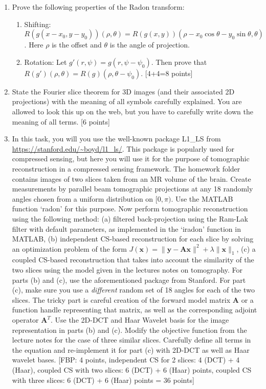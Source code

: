 \documentclass[11pt]{article}
\begin{document}
\begin{enumerate}
\item Prove the following properties of the Radon transform:
\begin{enumerate}
\item Shifting: $R(g(x-x_0,y-y_0))(\rho,\theta) = R(g(x,y))(\rho-x_0 \cos \theta - y_0 \sin \theta,\theta)$. Here $\rho$ is the offset and $\theta$ is the angle of projection.
\item Rotation: Let $g'(r,\psi) = g(r,\psi-\psi_0)$. Then prove that $R(g')(\rho,\theta) = R(g)(\rho,\theta-\psi_0)$.
\textsf{[4+4=8 points]}
\end{enumerate}

\item State the Fourier slice theorem for 3D images (and their associated 2D projections) with the meaning of all symbols carefully explained. You are allowed to look this up on the web, but you have to carefully write down the meaning of all terms. \textsf{[6 points]}

\item In this task, you will you use the well-known package L1\_LS from \url{https://stanford.edu/~boyd/l1_ls/}. This package is popularly used for compressed sensing, but here you will use it for the purpose of tomographic reconstruction in a compressed sensing framework. The homework folder contains images of two slices taken from an MR volume of the brain. Create measurements by parallel beam tomographic projections at any 18 randomly angles chosen from a uniform distribution on $[0,\pi)$. Use the MATLAB function `radon' for this purpose. Now perform tomographic reconstruction using the following method: (a) filtered back-projection using the Ram-Lak filter with default parameters, as implemented in the `iradon' function in MATLAB, (b) independent CS-based reconstruction for each slice by solving an optimization problem of the form $J(\boldsymbol{x}) = \|\boldsymbol{y}-\boldsymbol{Ax}\|^2 + \lambda \|\boldsymbol{x}\|_1$, (c) a coupled CS-based reconstruction that takes into account the similarity of the two slices using the model given in the lectures notes on tomography. For parts (b) and (c), use the aforementioned package from Stanford. For part (c), make sure you use a \emph{different} random set of 18 angles for each of the two slices. The tricky part is careful creation of the forward model matrix $\boldsymbol{A}$ or a function handle representing that matrix, as well as the corresponding adjoint operator $\boldsymbol{A}^T$. Use the 2D-DCT and Haar Wavelet basis for the image representation in parts (b) and (c). 
Modify the objective function from the lecture notes for the case of three similar slices. Carefully define all terms in the equation and re-implement it for part (c) with 2D-DCT as well as Haar wavelet bases. \textsf{[FBP: 4 points, independent CS for 2 slices: 4 (DCT) + 4 (Haar), coupled CS with two slices: 6 (DCT) + 6 (Haar) points, coupled CS with three slices: 6 (DCT) + 6 (Haar) points = 36  points]}


\end{enumerate}
\end{document}
